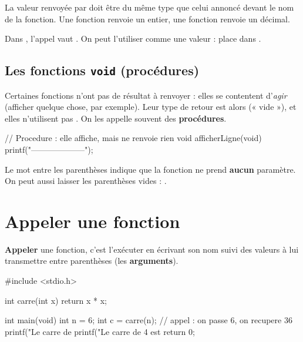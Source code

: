 La valeur renvoyée par  doit être du même type que celui annoncé
devant le nom de la fonction. Une fonction  renvoie un entier, une
fonction  renvoie un décimal.

\begin{exemple}
Dans , l'appel  vaut . On peut
l'utiliser comme une valeur :  place 
dans .
\end{exemple}

\subsection{Les fonctions \texttt{void} (procédures)}

Certaines fonctions n'ont pas de résultat à renvoyer : elles se contentent
d'\emph{agir} (afficher quelque chose, par exemple). Leur type de retour est
alors  (« vide »), et elles n'utilisent pas .
On les appelle souvent des \textbf{procédures}.

\begin{codec}
// Procedure : elle affiche, mais ne renvoie rien
void afficherLigne(void) {
    printf("--------------------\n");
}
\end{codec}

\begin{remarque}
Le mot  entre les parenthèses indique que la fonction ne prend
\textbf{aucun} paramètre. On peut aussi laisser les parenthèses vides :
.
\end{remarque}

\section{Appeler une fonction}

\textbf{Appeler} une fonction, c'est l'exécuter en écrivant son nom suivi des
valeurs à lui transmettre entre parenthèses (les \textbf{arguments}).

\begin{codec}
#include <stdio.h>

int carre(int x) {
    return x * x;
}

int main(void) {
    int n = 6;
    int c = carre(n);              // appel : on passe 6, on recupere 36
    printf("Le carre de %
    printf("Le carre de 4 est %
    return 0;
}
\end{codec}

